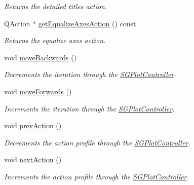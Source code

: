 \begin{DoxyCompactItemize}
\begin{DoxyCompactList}\small\item\em Returns the detailed titles action. \end{DoxyCompactList}\item 
\mbox{\label{classSGSolutionHandler_a56e01e9d69bd5f6d8bb1c478295570b0}} 
Q\+Action $\ast$ \hyperlink{classSGSolutionHandler_a56e01e9d69bd5f6d8bb1c478295570b0}{get\+Equalize\+Axes\+Action} () const
\begin{DoxyCompactList}\small\item\em Returns the equalize axes action. \end{DoxyCompactList}\item 
\mbox{\label{classSGSolutionHandler_a4ecac9faa12c6c6f3bdfeb5120511358}} 
void \hyperlink{classSGSolutionHandler_a4ecac9faa12c6c6f3bdfeb5120511358}{move\+Backwards} ()
\begin{DoxyCompactList}\small\item\em Decrements the iteration through the \hyperlink{classSGPlotController}{S\+G\+Plot\+Controller}. \end{DoxyCompactList}\item 
\mbox{\label{classSGSolutionHandler_a6a4d44d13270b683319bf3c06ae4d32f}} 
void \hyperlink{classSGSolutionHandler_a6a4d44d13270b683319bf3c06ae4d32f}{move\+Forwards} ()
\begin{DoxyCompactList}\small\item\em Increments the iteration through the \hyperlink{classSGPlotController}{S\+G\+Plot\+Controller}. \end{DoxyCompactList}\item 
\mbox{\label{classSGSolutionHandler_a24ed3c504b27308286c04078444e6082}} 
void \hyperlink{classSGSolutionHandler_a24ed3c504b27308286c04078444e6082}{prev\+Action} ()
\begin{DoxyCompactList}\small\item\em Decrements the action profile through the \hyperlink{classSGPlotController}{S\+G\+Plot\+Controller}. \end{DoxyCompactList}\item 
\mbox{\label{classSGSolutionHandler_ac2aab461d3ded6d0f30dcef0b83bffdd}} 
void \hyperlink{classSGSolutionHandler_ac2aab461d3ded6d0f30dcef0b83bffdd}{next\+Action} ()
\begin{DoxyCompactList}\small\item\em Increments the action profile through the \hyperlink{classSGPlotController}{S\+G\+Plot\+Controller}. \end{DoxyCompactList}\end{DoxyCompactItemize}
